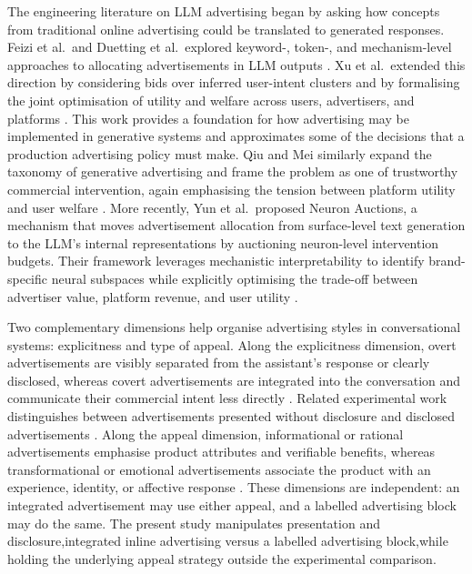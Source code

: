 \documentclass[english]{article}
\begin{document}
The engineering literature on LLM advertising began by asking how concepts from
traditional online advertising could be translated to generated responses.
Feizi et al.\ and Duetting et al.\ explored keyword-, token-, and mechanism-level
approaches to allocating advertisements in LLM outputs
\cite{feizi2023online,duetting2024mechanism}. Xu et al.\ extended this direction by
considering bids over inferred user-intent clusters and by formalising the joint
optimisation of utility and welfare across users, advertisers, and platforms
\cite{xu2026ad}. This work provides a foundation for how advertising may be
implemented in generative systems and approximates some of the decisions that a
production advertising policy must make. Qiu and Mei similarly expand the taxonomy
of generative advertising and frame the problem as one of trustworthy commercial
intervention, again emphasising the tension between platform utility and user
welfare \cite{qiu2026generative}. More recently, Yun et al.\ proposed Neuron Auctions, a mechanism that moves advertisement allocation from surface-level text generation to the LLM's internal representations by auctioning neuron-level intervention budgets. Their framework leverages mechanistic interpretability to identify brand-specific neural subspaces while explicitly optimising the trade-off between advertiser value, platform revenue, and user utility \cite{yun2026llmadvertisementbasedneuron}.

Two complementary dimensions help organise advertising styles in conversational
systems: explicitness and type of appeal. Along the explicitness dimension, overt
advertisements are visibly separated from the assistant's response or clearly
disclosed, whereas covert advertisements are integrated into the conversation and
communicate their commercial intent less directly
\cite{heineking2026detecting}. Related experimental work distinguishes between
advertisements presented without disclosure and disclosed advertisements
\cite{tang2025adstalkbackimplications}. Along the appeal dimension, informational
or rational advertisements emphasise product attributes and verifiable benefits,
whereas transformational or emotional advertisements associate the product with an
experience, identity, or affective response
\cite{puto1984informational,nuweihed2024informational}. These dimensions are
independent: an integrated advertisement may use either appeal, and a labelled
advertising block may do the same. The present study manipulates presentation and
disclosure,integrated inline advertising versus a labelled advertising
block,while holding the underlying appeal strategy outside the experimental
comparison.
\end{document}
